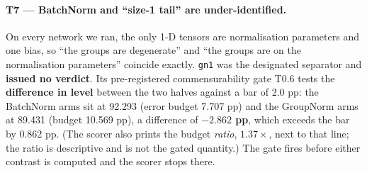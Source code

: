 \documentclass[10pt,letterpaper]{article}
\newcommand{\arm}[1]{\texttt{#1}}
\begin{document}
\paragraph{T7 --- BatchNorm and ``size-1 tail'' are under-identified.}
On every network we ran, the only 1-D tensors are normalisation parameters and one bias, so ``the
groups are degenerate'' and ``the groups are on the normalisation parameters'' coincide exactly.
\arm{gn1} was the designated separator and \textbf{issued no verdict}. Its pre-registered
commensurability gate T0.6 tests the \textbf{difference in level} between the two halves against a
bar of 2.0 pp: the BatchNorm arms sit at 92.293 (error budget 7.707 pp) and the GroupNorm arms at
89.431 (budget 10.569 pp), a difference of \textbf{$-2.862$ pp}, which exceeds the bar by
0.862 pp. (The scorer also prints the budget \emph{ratio}, $1.37\times$, next to that line; the
ratio is descriptive and is not the gated quantity.) The gate fires before either contrast is
computed and the scorer stops there.
\end{document}
